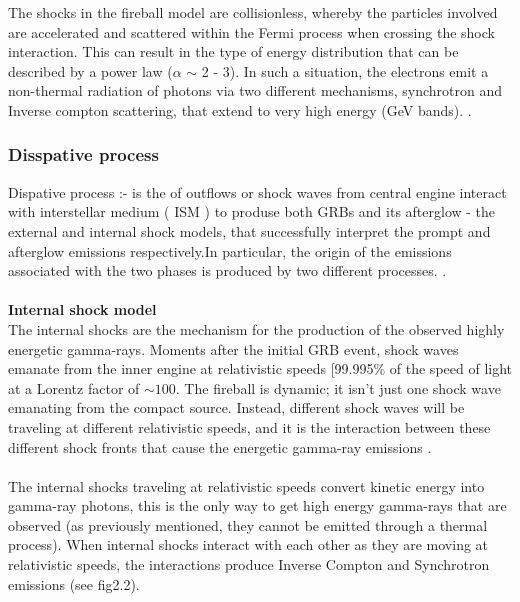 The shocks in the fireball model are collisionless, whereby the particles involved are accelerated and scattered within the Fermi process when crossing the shock interaction. This can result in the type of energy distribution that can be described by a power law ($ \alpha $  $ \sim $ 2 - 3). In such a situation, the electrons emit a non-thermal radiation of photons via two different mechanisms, synchrotron and Inverse compton scattering, that extend to very high energy (GeV bands). \citep{10} \citep{17}. 
\subsubsection{Disspative process}
Dispative process :- is the  of outflows or shock waves from central engine  interact with interstellar medium ( ISM ) to produse both GRBs and its afterglow - the external and internal shock models, that  successfully interpret the prompt and afterglow emissions respectively.In particular, the origin of the emissions associated with the two phases is produced by two different processes. \citep{8} \citep{17}.\\\\
\textbf{Internal shock model}\\
The internal shocks are the mechanism for the production of the observed highly energetic gamma-rays. Moments after the initial GRB event, shock waves emanate from the inner engine at relativistic speeds [99.995\%  of the speed of light at a Lorentz factor of $ \sim 100 $. The fireball is dynamic; it isn't just one shock wave emanating from the compact source. Instead, different shock waves will  be traveling at different relativistic speeds, and it is the interaction between these different shock fronts that cause the energetic gamma-ray emissions \citep{17}\citep{18}.\\\\
The internal shocks traveling  at relativistic speeds  convert  kinetic energy into gamma-ray photons, this is  the only way to  get high  energy gamma-rays that are observed (as previously mentioned, they cannot be emitted through a thermal process). When  internal shocks interact with  each  other as they  are  moving  at  relativistic  speeds, the  interactions  produce  Inverse  Compton and Synchrotron emissions\citep{18} (see fig2.2).\\\\
